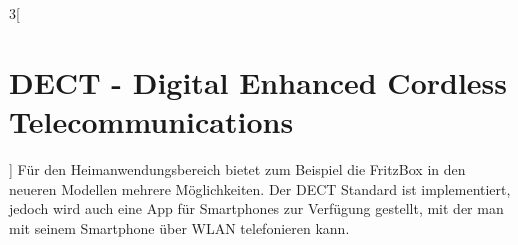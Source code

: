 \begin{multicols}{3}[\section{DECT - Digital Enhanced Cordless Telecommunications}]
Für den Heimanwendungsbereich bietet zum Beispiel die FritzBox in den neueren Modellen mehrere Möglichkeiten. Der DECT Standard ist implementiert, jedoch wird auch eine App für Smartphones zur Verfügung gestellt, mit der man mit seinem Smartphone über WLAN telefonieren kann. 
\cite{dect.6,dect.7,dect.8}
\printbibliography[segment=3,heading=subbibliography]
\end{multicols}

\newpage